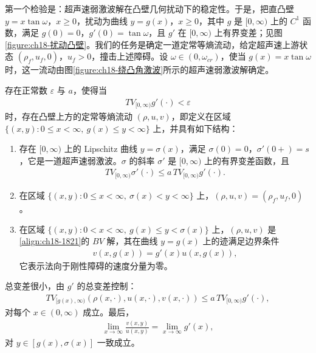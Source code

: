 \documentclass[../../main.tex]{subfiles}
\begin{document}
第一个检验是：超声速弱激波解在凸壁几何扰动下的稳定性。于是，把直凸壁 $y=x\tan\omega$，$x\geqslant0$，扰动为曲线 $y=g(x)$，$x\geqslant0$，其中 $g$ 是 $[0,\infty)$ 上的 $C^1$ 函数，满足 $g(0)=0$，$g'(0)=\tan\omega$，且 $g'$ 在 $[0,\infty)$ 上有界变差；见图\cref{figure:ch18-扰动凸壁}。我们的任务是确定一道定常等熵流动，给定超声速上游状态 $(\rho_f,u_f,0)$，$u_f>0$，撞击上述障碍。设 $\omega\in(0,\omega_{cr})$，使当 $g(x)=x\tan\omega$ 时，这一流动由图\cref{figure:ch18-绕凸角激波}所示的超声速弱激波解确定。

\begin{theorem}[弱激波解的结构稳定性]\label{theorem:ch18-弱激波稳定性}
存在正常数 $\varepsilon$ 与 $a$，使得当
\begin{align}
TV_{[0,\infty)}g'(\cdot)<\varepsilon
\label{align:ch18-1841}
\end{align}
时，存在凸壁上方的定常等熵流动 $(\rho,u,v)$，即定义在区域 $\{(x,y):0\leqslant x<\infty,\ g(x)\leqslant y<\infty\}$ 上，并具有如下结构：
\begin{enumerate}
\item\label{item:ch18-弱激波-a} 存在 $[0,\infty)$ 上的 Lipschitz 曲线 $y=\sigma(x)$，满足 $\sigma(0)=0$，$\sigma'(0+)=s$，它是一道超声速弱激波。$\sigma$ 的斜率 $\sigma'$ 是 $[0,\infty)$ 上的有界变差函数，且
\begin{align}
TV_{[0,\infty)}\sigma'(\cdot)\leqslant a\,TV_{[0,\infty)}g'(\cdot).
\label{align:ch18-1842}
\end{align}
\item\label{item:ch18-弱激波-b} 在区域 $\{(x,y):0\leqslant x<\infty,\ \sigma(x)<y<\infty\}$ 上，$(\rho,u,v)=(\rho_f,u_f,0)$。
\item\label{item:ch18-弱激波-c} 在区域 $\{(x,y):0<x<\infty,\ g(x)\leqslant y<\sigma(x)\}$ 上，$(\rho,u,v)$ 是\eqref{align:ch18-1821}的 $BV$ 解，其在曲线 $y=g(x)$ 上的迹满足边界条件
\begin{align}
v(x,g(x))=g'(x)u(x,g(x)),
\label{align:ch18-1843}
\end{align}
它表示法向于刚性障碍的速度分量为零。
\end{enumerate}
总变差很小，由 $g'$ 的总变差控制：
\begin{align}
TV_{[g(x),\infty)}(\rho(x,\cdot),u(x,\cdot),v(x,\cdot))\leqslant a\,TV_{[0,\infty)}g'(\cdot),
\label{align:ch18-1844}
\end{align}
对每个 $x\in(0,\infty)$ 成立。最后，
\begin{align}
\lim_{x\to\infty}\frac{v(x,y)}{u(x,y)}=\lim_{x\to\infty}g'(x),
\label{align:ch18-1845}
\end{align}
对 $y\in[g(x),\sigma(x)]$ 一致成立。
\end{theorem}
\end{document}
